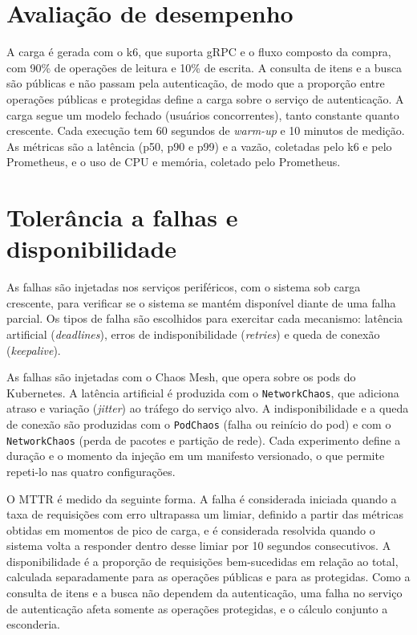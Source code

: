 \section{Avaliação de desempenho}

A carga é gerada com o k6, que suporta gRPC e o fluxo composto da compra, com 90\% de operações de
leitura e 10\% de escrita. A consulta de itens e a busca são públicas e não passam pela
autenticação, de modo que a proporção entre operações públicas e protegidas define a carga sobre o
serviço de autenticação. A carga segue um modelo fechado (usuários concorrentes), tanto constante
quanto crescente. Cada execução tem 60 segundos de \textit{warm-up} e 10 minutos de medição. As
métricas são a latência (p50, p90 e p99) e a vazão, coletadas pelo k6 e pelo Prometheus, e o uso de
CPU e memória, coletado pelo Prometheus.

\section{Tolerância a falhas e disponibilidade}\label{sec:falhas}

As falhas são injetadas nos serviços periféricos, com o sistema sob carga crescente, para verificar
se o sistema se mantém disponível diante de uma falha parcial. Os tipos de falha são escolhidos
para exercitar cada mecanismo: latência artificial (\textit{deadlines}), erros de indisponibilidade
(\textit{retries}) e queda de conexão (\textit{keepalive}).

As falhas são injetadas com o Chaos Mesh, que opera sobre os pods do Kubernetes. A
latência artificial é produzida com o \texttt{NetworkChaos}, que adiciona
atraso e variação (\textit{jitter}) ao tráfego do serviço alvo. A indisponibilidade e a queda de
conexão são produzidas com o \texttt{PodChaos} (falha ou reinício do pod) e com o
\texttt{NetworkChaos} (perda de pacotes e partição de rede). Cada experimento define a duração e o
momento da injeção em um manifesto versionado, o que permite repeti-lo nas quatro configurações.

O MTTR é medido da seguinte forma. A falha é considerada iniciada quando a taxa de requisições com
erro ultrapassa um limiar, definido a partir das métricas obtidas em momentos de pico de carga, e é
considerada resolvida quando o sistema volta a responder dentro desse limiar por 10 segundos
consecutivos. A disponibilidade é a proporção de requisições bem-sucedidas em relação ao total,
calculada separadamente para as operações públicas e para as protegidas. Como a consulta de itens e
a busca não dependem da autenticação, uma falha no serviço de autenticação afeta somente as
operações protegidas, e o cálculo conjunto a esconderia.

